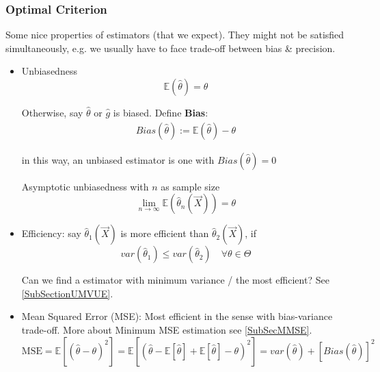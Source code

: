\subsubsection{Optimal Criterion}\label{SubSectionOptimalCriterion}
        Some nice properties of estimators (that we expect). They might not be satisfied simultaneously, e.g. we usually have to face trade-off between bias \& precision.
    \begin{itemize}
        \item Unbiasedness
        \begin{equation}
            \mathbb{E}(\hat{\theta})=\theta
        \end{equation}

        Otherwise, say $\hat{\theta}$ or $\hat{g}$ is biased. Define \textbf{Bias}:
        \begin{align}
            Bias(\hat{\theta }):= \mathbb{E}(\hat{\theta})-\theta
        \end{align}
        
        in this way, an unbiased estimator is one with $ Bias(\hat{\theta })=0 $

        Asymptotic unbiasedness with $ n $ as sample size
        \begin{equation}
            \lim_{n\to\infty}  \mathbb{E}(\hat{\theta }_n(\vec{X})) =\theta 
        \end{equation}
        \item Efficiency: say $\hat{\theta }_1(\vec{X})$ is more efficient than $\hat{\theta }_2(\vec{X})$, if
        \begin{equation}
            var(\hat{\theta }_1)\leq var(\hat{\theta }_2)  \quad\forall\theta\in\Theta  
        \end{equation}

        Can we find a estimator with minimum variance / the most efficient? See \autoref{SubSectionUMVUE}.
        \item Mean Squared Error (MSE): Most efficient in the sense with bias-variance trade-off. More about Minimum MSE estimation see \autoref{SubSecMMSE}.
        \begin{equation}\label{EqaMSEExpansion}
            \text{MSE}=\mathbb{E}[(\hat{\theta}-\theta)^2]=\mathbb{E}\left[ (\hat{\theta }-\mathbb{E}\left[ \hat{\theta}  \right] +\mathbb{E}\left[ \hat{\theta } \right]-\theta  )^2 \right] =var(\hat{\theta})+[Bias(\hat{\theta})]^2
        \end{equation}


\end{itemize}
